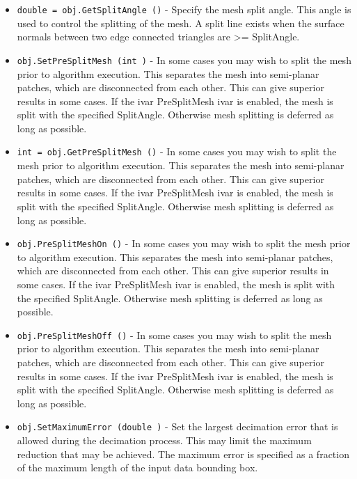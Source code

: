 \begin{itemize}
\item  \verb|double = obj.GetSplitAngle ()| -  Specify the mesh split angle. This angle is used to control the splitting
 of the mesh. A split line exists when the surface normals between
 two edge connected triangles are >= SplitAngle.

\item  \verb|obj.SetPreSplitMesh (int )| -  In some cases you may wish to split the mesh prior to algorithm
 execution. This separates the mesh into semi-planar patches, which are
 disconnected from each other. This can give superior results in some
 cases. If the ivar PreSplitMesh ivar is enabled, the mesh is split with
 the specified SplitAngle. Otherwise mesh splitting is deferred as long
 as possible.

\item  \verb|int = obj.GetPreSplitMesh ()| -  In some cases you may wish to split the mesh prior to algorithm
 execution. This separates the mesh into semi-planar patches, which are
 disconnected from each other. This can give superior results in some
 cases. If the ivar PreSplitMesh ivar is enabled, the mesh is split with
 the specified SplitAngle. Otherwise mesh splitting is deferred as long
 as possible.

\item  \verb|obj.PreSplitMeshOn ()| -  In some cases you may wish to split the mesh prior to algorithm
 execution. This separates the mesh into semi-planar patches, which are
 disconnected from each other. This can give superior results in some
 cases. If the ivar PreSplitMesh ivar is enabled, the mesh is split with
 the specified SplitAngle. Otherwise mesh splitting is deferred as long
 as possible.

\item  \verb|obj.PreSplitMeshOff ()| -  In some cases you may wish to split the mesh prior to algorithm
 execution. This separates the mesh into semi-planar patches, which are
 disconnected from each other. This can give superior results in some
 cases. If the ivar PreSplitMesh ivar is enabled, the mesh is split with
 the specified SplitAngle. Otherwise mesh splitting is deferred as long
 as possible.

\item  \verb|obj.SetMaximumError (double )| -  Set the largest decimation error that is allowed during the decimation
 process. This may limit the maximum reduction that may be achieved. The
 maximum error is specified as a fraction of the maximum length of
 the input data bounding box.


\end{itemize}
